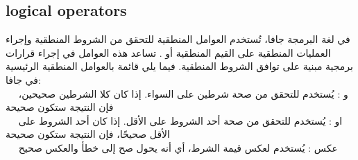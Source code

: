\subsection{logical operators}
\begin{AR}
  في لغة البرمجة جافا، تُستخدم العوامل المنطقية  للتحقق من الشروط المنطقية وإجراء العمليات المنطقية على القيم المنطقية  أو . تساعد هذه العوامل في إجراء قرارات برمجية مبنية على توافق الشروط المنطقية. فيما يلي قائمة بالعوامل المنطقية الرئيسية في جافا:
  \\
\ \ \LR{\textcolor{theme}{- 1}} و : يُستخدم للتحقق من صحة شرطين على السواء. إذا كان كلا الشرطين صحيحين، فإن النتيجة ستكون صحيحة
\\
\ \ \LR{\textcolor{theme}{- 2}} او : يُستخدم للتحقق من صحة أحد الشروط على الأقل. إذا كان أحد الشروط على الأقل صحيحًا، فإن النتيجة ستكون صحيحة
\\
\ \ \LR{\textcolor{theme}{- 3}} عكس : يُستخدم لعكس قيمة الشرط، أي أنه يحول صح إلى خطأ والعكس صحيح
\end{AR}


